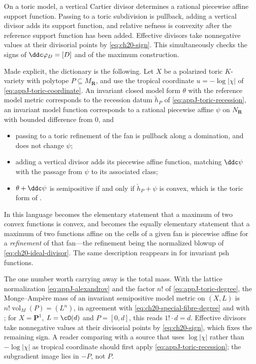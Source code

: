 \begin{example}
\label{ex:ch20-toric}
On a toric model, a vertical Cartier divisor determines a rational
piecewise affine support function.  Passing to a toric subdivision is
pullback, adding a vertical divisor adds its support function, and relative
nefness is convexity after the reference support function has been added.
Effective divisors take nonnegative values at their divisorial points by
\eqref{eq:ch20-sign}.  This simultaneously checks the signs of
\(\ddc\varphi_D=[D]\) and of the maximum construction.

Made explicit, the dictionary is the following.  Let \(X\) be a polarized
toric \(K\)-variety with polytope \(P\subseteq M_{\mathbf R}\), and use the
tropical coordinate \(u=-\log|\chi|\) of \eqref{eq:appJ-toric-coordinate}.
An invariant closed model form \(\theta\) with the reference model metric
corresponds to the recession datum \(\check h_P\) of
\eqref{eq:appJ-toric-recession}, an invariant model function corresponds to
a rational piecewise affine \(\psi\) on \(N_{\mathbf R}\) with bounded
difference from \(0\), and
\begin{itemize}
\item passing to a toric refinement of the fan is pullback along a
 domination, and does not change \(\psi\);
\item adding a vertical divisor adds its piecewise affine function, matching
 \(\ddc\psi\) with the passage from \(\psi\) to its associated class;
\item \(\theta+\ddc\psi\) is semipositive if and only if
 \(\check h_P+\psi\) is convex, which is the toric form of
 .
\end{itemize}
In this language  becomes the elementary statement
that a maximum of two convex functions is convex, and
 becomes the equally elementary statement
that a maximum of two functions affine on the cells of a given fan is
piecewise affine for a \emph{refinement} of that fan---the refinement being
the normalized blowup of \eqref{eq:ch20-ideal-divisor}.  The same
description reappears in  for invariant psh functions.

The one number worth carrying away is the total mass.  With the lattice
normalization \eqref{eq:appJ-alexandrov} and the factor \(n!\) of
\eqref{eq:appJ-toric-degree}, the Monge--Amp\`ere mass of an invariant
semipositive model metric on \((X,L)\) is
\(n!\operatorname{vol}_M(P)=(L^n)\), in agreement with
\eqref{eq:ch20-special-fibre-degree} and with
; for \(X=\mathbf P^1\), \(L=\cO(d)\) and
\(P=[0,d]\), this reads \(1!\cdot d=d\).  Effective divisors take
nonnegative values at their divisorial points by \eqref{eq:ch20-sign}, which
fixes the remaining sign.  A reader comparing with a source that uses
\(\log|\chi|\) rather than \(-\log|\chi|\) as tropical coordinate should
first apply \eqref{eq:appJ-toric-recession}; the subgradient image lies in
\(-P\), not \(P\).
\end{example}

